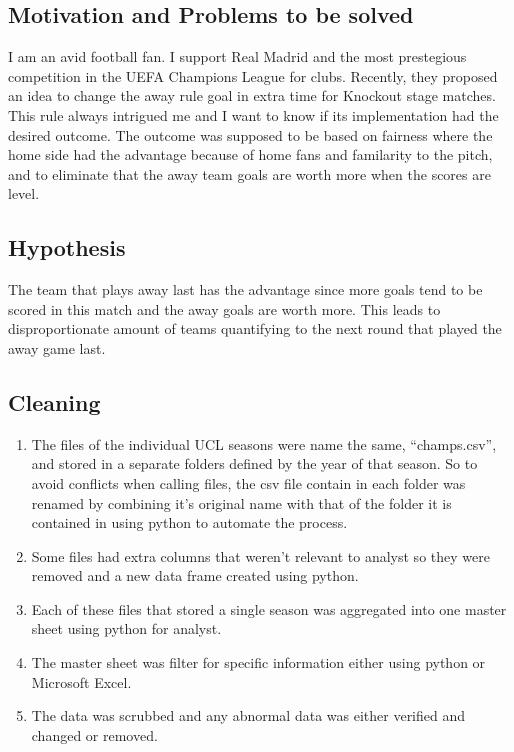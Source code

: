 \documentclass[
]{article}
\providecommand{\tightlist}{%
  \setlength{\itemsep}{0pt}\setlength{\parskip}{0pt}}
\begin{document}
\hypertarget{motivation-and-problems-to-be-solved}{%
\subsection{Motivation and Problems to be
solved}\label{motivation-and-problems-to-be-solved}}

I am an avid football fan. I support Real Madrid and the most
prestegious competition in the UEFA Champions League for clubs.
Recently, they proposed an idea to change the away rule goal in extra
time for Knockout stage matches. This rule always intrigued me and I
want to know if its implementation had the desired outcome. The outcome
was supposed to be based on fairness where the home side had the
advantage because of home fans and familarity to the pitch, and to
eliminate that the away team goals are worth more when the scores are
level.

\hypertarget{hypothesis}{%
\subsection{Hypothesis}\label{hypothesis}}

The team that plays away last has the advantage since more goals tend to
be scored in this match and the away goals are worth more. This leads to
disproportionate amount of teams quantifying to the next round that
played the away game last.

\hypertarget{cleaning}{%
\subsection{Cleaning}\label{cleaning}}

\begin{enumerate}
\def\labelenumi{\arabic{enumi}.}
\tightlist
\item
  The files of the individual UCL seasons were name the same,
  ``champs.csv'', and stored in a separate folders defined by the year
  of that season. So to avoid conflicts when calling files, the csv file
  contain in each folder was renamed by combining it's original name
  with that of the folder it is contained in using python to automate
  the process.
\item
  Some files had extra columns that weren't relevant to analyst so they
  were removed and a new data frame created using python.
\item
  Each of these files that stored a single season was aggregated into
  one master sheet using python for analyst.
\item
  The master sheet was filter for specific information either using
  python or Microsoft Excel.
\item
  The data was scrubbed and any abnormal data was either verified and
  changed or removed.
\end{enumerate}
\end{document}
